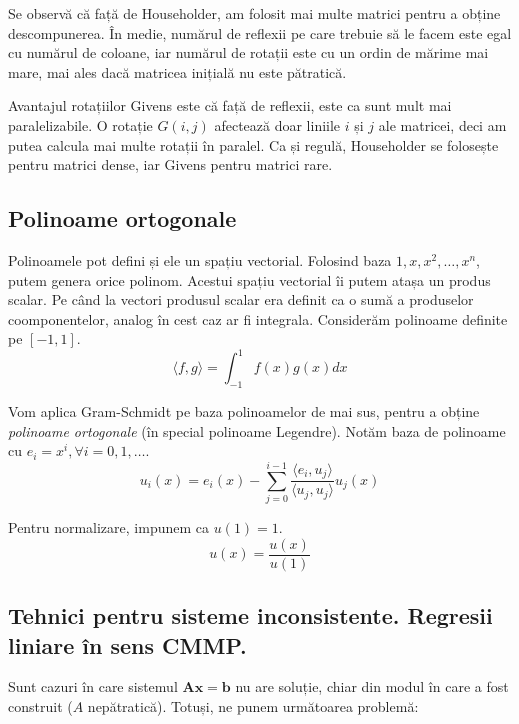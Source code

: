 \documentclass{exam}
\begin{document}
Se observă că față de Householder, am folosit mai multe matrici pentru a
obține descompunerea. În medie, numărul de reflexii pe care trebuie să le facem
este egal cu numărul de coloane, iar numărul de rotații este cu un ordin de
mărime mai mare, mai ales dacă matricea inițială nu este pătratică.

Avantajul rotațiilor Givens este că față de reflexii, este ca sunt mult mai
paralelizabile. O rotație $G(i, j)$ afectează doar liniile $i$ și $j$ ale
matricei, deci am putea calcula mai multe rotații în paralel. Ca și regulă,
Householder se folosește pentru matrici dense, iar Givens pentru matrici
rare.

\subsection{Polinoame ortogonale}

Polinoamele pot defini și ele un spațiu vectorial. Folosind baza ${1, x, x^2, \dots, x^n}$,
putem genera orice polinom. Acestui spațiu vectorial îi putem atașa un produs
scalar. Pe când la vectori produsul scalar era definit ca o sumă a produselor
coomponentelor, analog în cest caz ar fi integrala. Considerăm polinoame
definite pe $[-1, 1]$.
\begin{equation*}
	\langle f, g \rangle = \int_{-1}^{1} f(x) g(x) dx
\end{equation*}

Vom aplica Gram-Schmidt pe baza polinoamelor de mai sus, pentru a obține
\textit{polinoame ortogonale} (în special polinoame Legendre). Notăm baza de
polinoame cu $e_i = x^i, \forall i = 0, 1, \dots$.
\begin{equation*}
	u_i (x) = e_i (x) - \sum_{j = 0}^{i - 1} \frac{\langle e_i, u_j \rangle}{\langle u_j, u_j \rangle} u_j (x)
\end{equation*}

Pentru normalizare, impunem ca $u(1) = 1$.
\begin{equation*}
	u (x) = \frac{u(x)}{u(1)}
\end{equation*}

\subsection{Tehnici pentru sisteme inconsistente. Regresii liniare în sens CMMP.}

Sunt cazuri în care sistemul $\mathbf{Ax} = \mathbf{b}$ nu are soluție, chiar
din modul în care a fost construit ($A$ nepătratică). Totuși, ne punem
următoarea problemă:
\end{document}
